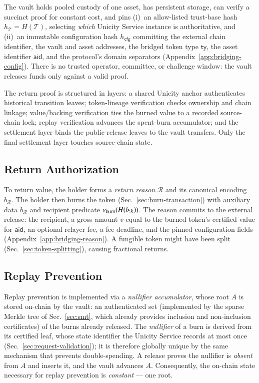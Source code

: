 The vault holds pooled custody of one asset, has persistent storage, can verify a succinct proof for constant cost, and pins (i)~an allow-listed trust-base hash $h_\mathcal{T} = H(\mathcal{T})$, selecting \emph{which} Unicity Service instance is authoritative, and (ii)~an immutable configuration hash $h_\mathsf{cfg}$ committing the external chain identifier, the vault and asset addresses, the bridged token type $\mathsf{ty}$, the asset identifier $\mathsf{aid}$, and the protocol's domain separators (Appendix~\ref{app:bridging-config}). There is no trusted operator, committee, or challenge window: the vault releases funds only against a valid proof.

The return proof is structured in layers: a shared Unicity anchor authenticates historical transition leaves; token-lineage verification checks ownership and chain linkage; value/backing verification ties the burned value to a recorded source-chain lock; replay verification advances the spent-burn accumulator; and the settlement layer binds the public release leaves to the vault transfers. Only the final settlement layer touches source-chain state.

\subsection{Return Authorization}\label{sec:bridge-return-reason}

To return value, the holder forms a \emph{return reason} $\mathcal{R}$ and its canonical encoding $b_\mathcal{R}$. The holder then burns the token (Sec.~\ref{sec:burn-transaction}) with auxiliary data $b_\mathcal{R}$ and recipient predicate $\nu_\mathsf{burn}(H(b_\mathcal{R}))$. The reason commits to the external release: the recipient, a gross amount $v$ equal to the burned token's certified value for $\mathsf{aid}$, an optional relayer fee, a fee deadline, and the pinned configuration fields (Appendix~\ref{app:bridging-reason}). A fungible token might have been split (Sec.~\ref{sec:token-splitting}), causing fractional returns.

\subsection{Replay Prevention}\label{sec:bridge-replay}

Replay prevention is implemented via a \emph{nullifier accumulator}, whose root $A$ is stored on-chain by the vault: an authenticated set (implemented by the sparse Merkle tree of Sec.~\ref{sec:smt}, which already provides inclusion and non-inclusion certificates) of the burns already released. The \emph{nullifier} of a burn is derived from its certified leaf, whose state identifier the Unicity Service records at most once (Sec.~\ref{sec:request-validation}); it is therefore globally unique by the same mechanism that prevents double-spending. A release proves the nullifier is \emph{absent} from $A$ and inserts it, and the vault advances $A$. Consequently, the on-chain state necessary for replay prevention is \emph{constant} --- one root.

